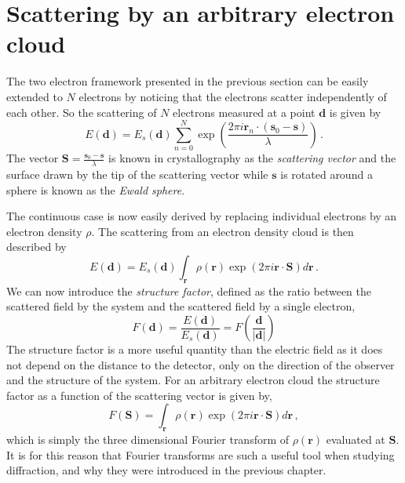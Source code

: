 \section{Scattering by an arbitrary electron cloud}\label{scat_cloud}

The two electron framework presented in the previous section can be easily
extended to $N$ electrons by noticing that the electrons scatter independently
of each other. So the scattering of $N$ electrons measured at a point $\mathbf d$
is given by
\begin{equation}
E(\mathbf d) = E_s(\mathbf d) \sum_{n=0}^N \exp\left(\frac{2 \pi i \mathbf r_n \cdot(\mathbf s_0 -
\mathbf s)}{\lambda}\right) \, .
\end{equation}
The vector $\mathbf S = \frac{\mathbf s_0 - \mathbf s}{\lambda}$ is known in crystallography
as the {\em scattering vector} and the surface drawn by the tip of the
scattering vector while $\mathbf s$ is rotated around a sphere is known as the
{\em Ewald sphere}.

The continuous case is now easily derived by replacing individual electrons by
an electron density $\rho$. The scattering from an electron density cloud is
then described by
\begin{equation}
E(\mathbf d) = E_s(\mathbf d) \int_{\mathbf r} \rho(\mathbf r) \exp\left(2
    \pi i \mathbf r \cdot \mathbf S \right) d\mathbf r\, .
\end{equation}
We can now introduce the {\em structure factor}, defined as the ratio between
the scattered field by the system and the scattered field by a single
electron,
\begin{equation}
F(\mathbf d) = \frac{E(\mathbf d)}{E_s(\mathbf d)} = F\left(\frac{\mathbf d}{|\mathbf d|}\right)
\end{equation}
The structure factor is a more useful quantity than the electric field as it does not depend
on the distance to the detector, only on the direction of the observer and the
structure of the system. For an arbitrary electron cloud the structure factor as
a function of the scattering vector is given by,
\begin{equation}
F(\mathbf S) = \int_{\mathbf r} \rho(\mathbf r) \exp\left(2
    \pi i \mathbf r \cdot \mathbf S \right) d\mathbf r\, ,
\end{equation}
which is simply the three dimensional Fourier transform of $\rho(\mathbf r)$
evaluated at $\mathbf S$. It is for this reason that Fourier transforms are such
a useful tool when studying diffraction, and why they were introduced in the
previous chapter.


